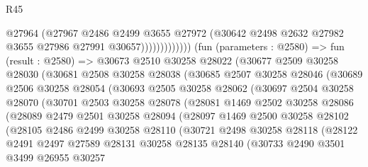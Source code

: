 \begin{lexlean}{R45}
\begin{coremodule}
                              @27964
                              (@27967
                                @2486
                                @2499
                                @3655
                                @27972
                                (@30642 @2498 @2632 @27982 @3655 @27986 @27991 @30657)))))))))))))
        (fun (parameters : @2580) =>
        fun (result : @2580) =>
        @30673
          @2510
          @30258
          @28022
          (@30677
            @2509
            @30258
            @28030
            (@30681
              @2508
              @30258
              @28038
              (@30685
                @2507
                @30258
                @28046
                (@30689
                  @2506
                  @30258
                  @28054
                  (@30693
                    @2505
                    @30258
                    @28062
                    (@30697
                      @2504
                      @30258
                      @28070
                      (@30701
                        @2503
                        @30258
                        @28078
                        (@28081
                          @1469
                          @2502
                          @30258
                          @28086
                          (@28089
                            @2479
                            @2501
                            @30258
                            @28094
                            (@28097
                              @1469
                              @2500
                              @30258
                              @28102
                              (@28105
                                @2486
                                @2499
                                @30258
                                @28110
                                (@30721
                                  @2498
                                  @30258
                                  @28118
                                  (@28122
                                    @2491
                                    @2497
                                    @27589
                                    @28131
                                    @30258
                                    @28135
                                    @28140
                                    (@30733
                                      @2490
                                      @3501
                                      @3499
                                      @26955
                                      @30257

\end{coremodule}
\end{lexlean}
